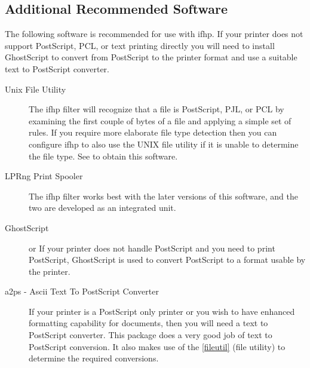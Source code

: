 \documentclass[a4paper]{article}
\begin{document}
\subsection{Additional Recommended Software}

The following software is recommended for use with {\ttfamily ifhp}.
If your printer does not support PostScript, PCL, or text printing directly
you will need to install GhostScript to convert from PostScript to the printer
format and use a suitable text to PostScript converter.
\begin{description}
\item[Unix File Utility] \mbox{}

\label{fileutil}
The {\ttfamily ifhp} filter will recognize that a file
is PostScript, PJL, or PCL by examining the first
couple of bytes of a file and applying a simple set of rules.
If you require more elaborate file type detection then you can
configure {\ttfamily ifhp} to also use the UNIX {\ttfamily file} utility
if it is unable to determine the file type.
See 
to obtain this software.



\item[LPRng Print Spooler] \mbox{}

The {\ttfamily ifhp} filter works best with the later versions of this software,
and the two are developed as an integrated unit.



\item[GhostScript] \mbox{}

\label{ghostscript}
or
If your printer does not handle PostScript and you need to print PostScript,
GhostScript is used to convert PostScript to a format usable by the printer.



\item[a2ps - Ascii Text To PostScript Converter] \mbox{}

\label{a2ps}
If your printer is a PostScript only printer or you wish to have enhanced
formatting capability for documents,  then you will need a text to PostScript converter.
This package does a very good job of text to PostScript conversion.
It also makes use of the
\ref{fileutil} {(file utility)} to determine the required conversions.




\end{description}
\end{document}
